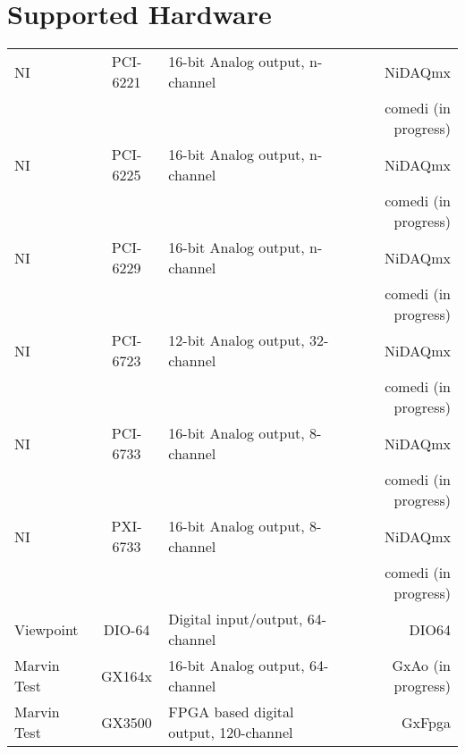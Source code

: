 \section{Supported Hardware}\label{sec:hardware}
\begin{center}
\tablelasttail{\hline}
%
%
\begin{supertabular}{|l|c|l|r|}
  NI & PCI-6221 & 16-bit Analog output, n-channel & NiDAQmx \\
     &          &                                 & comedi (in progress) \\
  NI & PCI-6225 & 16-bit Analog output, n-channel & NiDAQmx \\
     &          &                                 & comedi (in progress) \\
  NI & PCI-6229 & 16-bit Analog output, n-channel & NiDAQmx \\
     &          &                                 & comedi (in progress) \\
  NI & PCI-6723 & 12-bit Analog output, 32-channel & NiDAQmx \\
     &          &                                 & comedi (in progress) \\
  NI & PCI-6733 & 16-bit Analog output, 8-channel & NiDAQmx \\
     &          &                                 & comedi (in progress) \\
  NI & PXI-6733 & 16-bit Analog output, 8-channel & NiDAQmx \\
     &          &                                 & comedi (in progress) \\
  Viewpoint & DIO-64 & Digital input/output, 64-channel & DIO64 \\
  Marvin Test & GX164x & 16-bit Analog output, 64-channel & GxAo (in progress) \\
  Marvin Test & GX3500 & FPGA based digital output, 120-channel & GxFpga \\
\end{supertabular}
\end{center}

